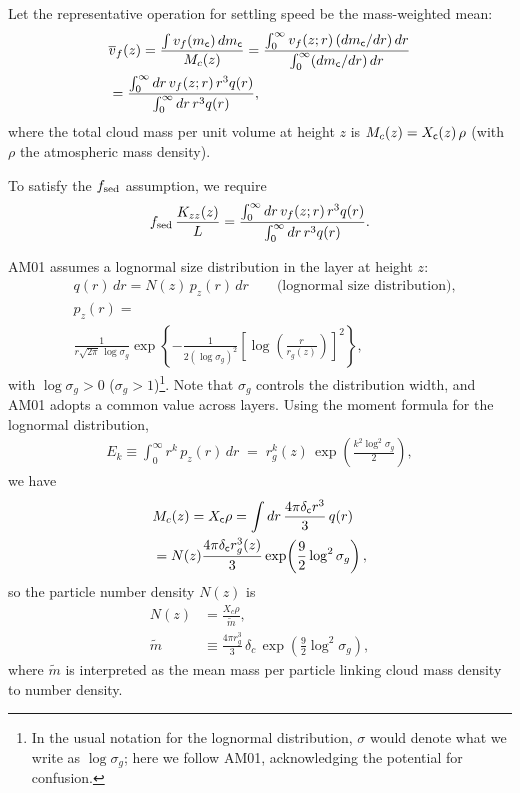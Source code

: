 Let the representative operation for settling speed be the mass-weighted mean:
\begin{align}
\label{eq:fsedw}
&\overline{v}_f(z) 
= \frac{\int v_f(m_{\mathsf{c}})\, dm_{\mathsf{c}}}{M_c(z)}
= \frac{\int_0^\infty v_f(z; r)\, (dm_{\mathsf{c}}/dr)\, dr}{ \int_0^\infty (dm_{\mathsf{c}}/dr)\, dr } \nonumber \\
&= \frac{\int_0^\infty dr \, v_f(z;r)\, r^3 q(r)}{ \int_0^\infty dr \, r^3 q(r)},
\end{align}
where the total cloud mass per unit volume at height $z$ is $M_c(z)=X_{\mathsf{c}}(z)\,\rho$ (with $\rho$ the atmospheric mass density).

To satisfy the $f_\mathrm{sed}$ assumption, we require
\begin{align}
\label{eq:fsedw2}
f_\mathrm{sed}\, \frac{K_{zz}(z)}{L} 
= \frac{\int_0^\infty dr \, v_f(z;r)\, r^3 q(r)}{ \int_0^\infty dr \, r^3 q(r)}.
\end{align}

AM01 assumes a lognormal size distribution in the layer at height $z$:
\begin{align}
\label{eq:lognormal_am01}
&q(r)\, dr = N(z)\, p_z(r)\, dr \qquad\text{(lognormal size distribution)}, \\
&p_z(r) = \nonumber \\
&\frac{1}{r \sqrt{2 \pi}\, \log{\sigma_g}} 
\exp\!\left\{ - \frac{1}{2 (\log{\sigma_g})^2} \left[\log\!\left(\frac{r}{r_g(z)}\right)\right]^{\!2} \right\},
\end{align}
with $\log{\sigma_g}>0$ ($\sigma_g>1$)\footnote{In the usual notation for the lognormal distribution, $\sigma$ would denote what we write as $\log{\sigma_g}$; here we follow AM01, acknowledging the potential for confusion.}.  
Note that $\sigma_g$ controls the distribution width, and AM01 adopts a common value across layers.  
Using the moment formula for the lognormal distribution,
\begin{align}
E_k \equiv \int_0^\infty r^k\, p_z(r)\, dr \;=\; r_g^k(z)\, \exp\!\left(\frac{k^2 \log^2{\sigma_g}}{2}\right),
\end{align}
we have
\begin{align}
&M_c(z) = X_{\mathsf{c}} \rho 
= \int dr \, \frac{4 \pi \delta_{\mathsf{c}} r^3}{3}\, q(r) \nonumber \\
&= N(z) \frac{4 \pi \delta_{\mathsf{c}} r_g^3(z)}{3} \exp\!\left(\frac{9}{2}\log^2 \sigma_g\right),
\end{align}
so the particle number density $N(z)$ is
\begin{align}
\label{eq:lognormal_am01N}
N(z) &= \frac{X_c \rho}{\tilde{m}}, \\ 
\label{eq:lognormal_mean_mass}
\tilde{m} &\equiv \frac{4 \pi r_g^3}{3}\, \delta_c \, \exp\!\left(\frac{9}{2} \log^2{\sigma_g} \right),
\end{align}
where $\tilde{m}$ is interpreted as the mean mass per particle linking cloud mass density to number density.

